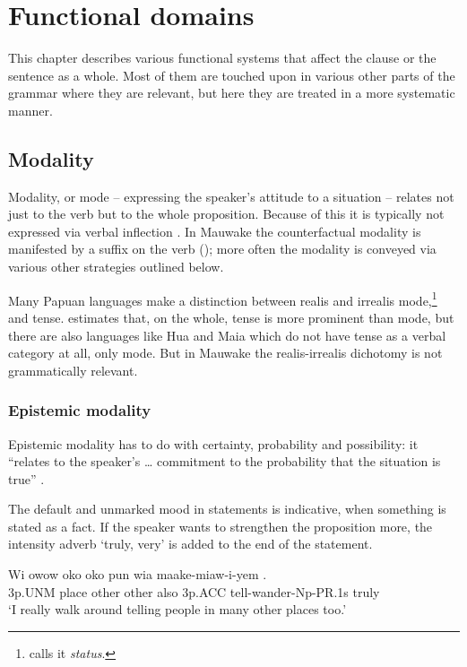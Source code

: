 
\chapter{Functional domains}
\hypertarget{RefHeading22301935131865}{}
This chapter describes various functional systems that affect the clause or the sentence as a whole.  Most of them are touched upon in various other parts of the grammar where they are relevant, but here they are treated in a more systematic manner.

\section{Modality}
\hypertarget{RefHeading22321935131865}{}
Modality, or mode -- expressing the speaker's attitude to a situation -- relates not just to the verb but to the whole proposition. Because of this it is typically not expressed via verbal inflection \citep[22]{Bybee1985}.  In Mauwake the counterfactual modality is manifested by a suffix on the verb (); more often the modality is conveyed via various other strategies outlined below.

Many Papuan languages make a distinction between realis and irrealis mode,\footnote{\citet[158]{Foley1986} calls it \textit{status}.} and tense. \citet[162]{Foley1986} estimates that, on the whole, tense is more prominent than mode, but there are also languages like Hua \citep{Haiman1980} and Maia \citep{Hardin2002} which do not have tense as a verbal category at all, only mode. But in Mauwake the realis-irrealis dichotomy is not grammatically relevant. 

\subsection{Epistemic modality}
\hypertarget{RefHeading22341935131865}{}
Epistemic modality has to do with certainty, probability and possibility: it ``relates to the speaker's {\dots} commitment to the probability that the situation is true'' \citep[234]{Payne1997}.  

The default  and unmarked mood in statements is indicative, when something is stated as a fact. If the speaker wants to strengthen the proposition more, the intensity adverb  `truly, very' is added to the end of the statement.

\ea%
\label{ex:x1050}
\gll Wi  owow  oko  oko  pun  wia  maake-miaw-i-yem . \\
     3p.UNM  place  other  other  also  3p.ACC  tell-wander-Np-PR.1s truly\\
\glt `I really walk around telling people in many other places too.'
\z



